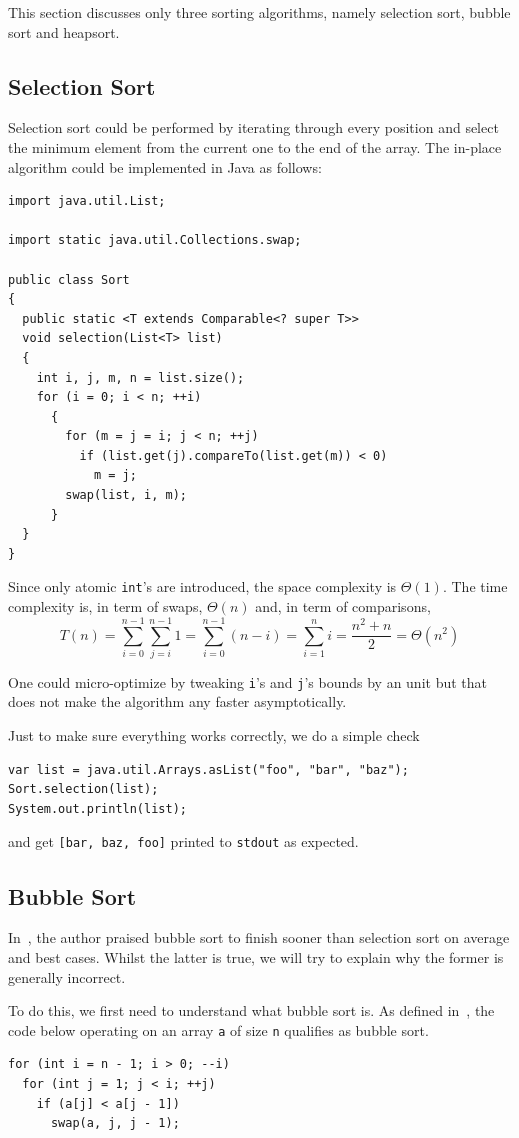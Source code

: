 \documentclass[a4paper,12pt]{article}
\begin{document}
This section discusses only three sorting algorithms,
namely selection sort, bubble sort and heapsort.

\subsection{Selection Sort}
Selection sort could be performed by iterating through every position and select
the minimum element from the current one to the end of the array.  The in-place
algorithm could be implemented in Java as follows:
\begin{verbatim}
import java.util.List;

import static java.util.Collections.swap;

public class Sort
{
  public static <T extends Comparable<? super T>>
  void selection(List<T> list)
  {
    int i, j, m, n = list.size();
    for (i = 0; i < n; ++i)
      {
        for (m = j = i; j < n; ++j)
          if (list.get(j).compareTo(list.get(m)) < 0)
            m = j;
        swap(list, i, m);
      }
  }
}
\end{verbatim}

Since only atomic \verb|int|'s are introduced, the space complexity is
$\Theta(1)$.  The time complexity is, in term of swaps, $\Theta(n)$
and, in term of comparisons,
\[T(n) = \sum_{i=0}^{n-1}\sum_{j=i}^{n-1}1
       = \sum_{i=0}^{n-1}(n - i)
       = \sum_{i=1}^{n}i
       = \frac{n^2 + n}{2}
       = \Theta(n^2)\]

One could micro-optimize by tweaking \verb|i|'s and \verb|j|'s
bounds by an unit but that does not make the algorithm
any faster asymptotically.

Just to make sure everything works correctly, we do a simple check
\begin{verbatim}
var list = java.util.Arrays.asList("foo", "bar", "baz");
Sort.selection(list);
System.out.println(list);
\end{verbatim}
and get \verb|[bar, baz, foo]| printed to \verb|stdout| as expected.

\subsection{Bubble Sort}
In~\cite[p. 646]{wu}, the author praised bubble sort to finish sooner than
selection sort on average and best cases.  Whilst the latter is true,
we will try to explain why the former is generally incorrect.

To do this, we first need to understand what bubble sort is.
As defined in~\cite[p. 40]{clrs}, the code below operating on
an array \verb|a| of size \verb|n| qualifies as bubble sort.
\begin{verbatim}
for (int i = n - 1; i > 0; --i)
  for (int j = 1; j < i; ++j)
    if (a[j] < a[j - 1])
      swap(a, j, j - 1);
\end{verbatim}
\end{document}
